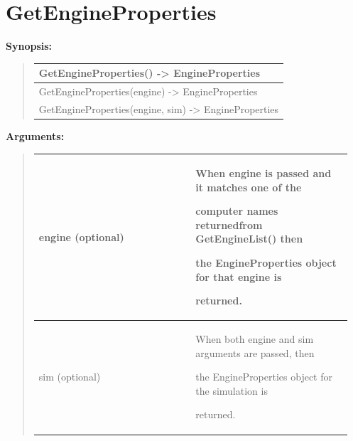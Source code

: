 \documentclass[letterpaper,10pt,english]{sphinxmanual}
\begin{document}
\section{GetEngineProperties}
\label{functions:getengineproperties}
\begin{DUlineblock}{0em}
\item[] \textbf{Synopsis:}
\end{DUlineblock}
\begin{quote}

\begin{tabulary}{\linewidth}{|L|}
\hline

GetEngineProperties()            -\textgreater{} EngineProperties
\\
\hline
GetEngineProperties(engine)      -\textgreater{} EngineProperties
\\
\hline
GetEngineProperties(engine, sim) -\textgreater{} EngineProperties
\\
\hline\end{tabulary}

\end{quote}

\begin{DUlineblock}{0em}
\item[] 
\item[] \textbf{Arguments:}
\end{DUlineblock}
\begin{quote}

\begin{tabular}{|p{0.475\linewidth}|p{0.475\linewidth}|}
\hline

engine (optional)
 & 
\begin{DUlineblock}{0em}
\item[] When engine is passed and it matches one of the
\item[] computer names returnedfrom GetEngineList() then
\item[] the EngineProperties object for that engine is
\item[] returned.
\end{DUlineblock}
\\
\hline
sim (optional)
 & 
\begin{DUlineblock}{0em}
\item[] When both engine and sim arguments are passed, then
\item[] the EngineProperties object for the simulation is
\item[] returned.
\end{DUlineblock}
\\
\hline\end{tabular}

\end{quote}
\end{document}
